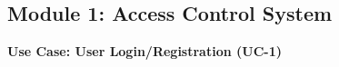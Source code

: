



\subsection*{Module 1: Access Control System}
\label{module:minipage:access_control}

\begin{minipage}{\textwidth}
\begin{center}
    \textbf{Use Case: User Login/Registration (UC-1)}
\end{center}
\vspace{0.5ex} %
\small %


\end{minipage}
